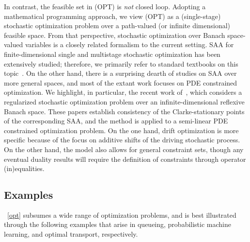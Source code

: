\documentclass[11pt,leqno]{amsart}
\begin{document}
In contrast, the feasible set in (OPT) is {\it not} closed loop. Adopting a mathematical programming approach, we view (OPT) as a (single-stage) stochastic optimization problem over a path-valued (or infinite dimensional) feasible space. From that perspective, stochastic optimization over Banach space-valued variables is a closely related formalism to the current setting. SAA for finite-dimensional single and multistage stochastic optimization has been extensively studied; therefore, we primarily refer to standard textbooks on this topic~\citep[Chapter 8]{Shapiro_2021}. On the other hand, there is a surprising dearth of studies on SAA over more general spaces, and most of the extant work focuses on PDE constrained optimization. We highlight, in particular, the recent work of~\cite{Milz2023,Milz2023b}, which considers a regularized stochastic optimization problem over an infinite-dimensional reflexive Banach space. These papers establish consistency of the Clarke-stationary points of the corresponding SAA, and the method is applied to a semi-linear PDE constrained optimization problem. On the one hand, drift optimization is more specific because of the focus on additive shifts of the driving stochastic process. On the other hand, the model also allows for general constraint sets, though any eventual duality results will require the definition of constraints through operator (in)equalities. %


\subsection{Examples}
~\eqref{opt} subsumes a wide range of optimization problems, and is best illustrated through the following examples that arise in queueing, probabilistic machine learning, and optimal transport, respectively.
\end{document}

